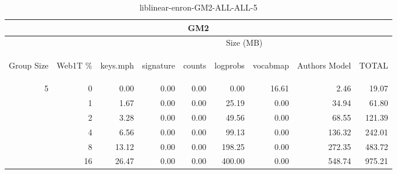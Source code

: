 \begin{center}
\begin{table}[htbp] 
 \begin{center}
\begin{tabular}{ | r | r | r | r | r | r | r | r | r |}
\hline
\multicolumn{9}{|c|}{GM2}\\
\hline
 & & \multicolumn{7}{|c|}{Size (MB)}\\ \cline{3-9}
\begin{sideways}Group Size\end{sideways} & \begin{sideways}Web1T \% \end{sideways} & \begin{sideways}keys.mph\end{sideways} & \begin{sideways}signature\end{sideways} & \begin{sideways}counts\end{sideways} & \begin{sideways}logprobs\end{sideways} & \begin{sideways}vocabmap\end{sideways} & \begin{sideways}Authors Model \end{sideways} & \begin{sideways}TOTAL\end{sideways}\\
\hline
\multirow{5}{*}{5}
 & 0 & 0.00 & 0.00 & 0.00 & 0.00 & 16.61 & 2.46 & 19.07\\ \cline{2-9}
 & 1 & 1.67 & 0.00 & 0.00 & 25.19 & 0.00 & 34.94 & 61.80\\ \cline{2-9}
 & 2 & 3.28 & 0.00 & 0.00 & 49.56 & 0.00 & 68.55 & 121.39\\ \cline{2-9}
 & 4 & 6.56 & 0.00 & 0.00 & 99.13 & 0.00 & 136.32 & 242.01\\ \cline{2-9}
 & 8 & 13.12 & 0.00 & 0.00 & 198.25 & 0.00 & 272.35 & 483.72\\ \cline{2-9}
 & 16 & 26.47 & 0.00 & 0.00 & 400.00 & 0.00 & 548.74 & 975.21\\ \cline{2-9}
\hline
\end{tabular}
\caption{liblinear-enron-GM2-ALL-ALL-5}
\label{table:liblinear-enron-GM2-ALL-ALL-5}
\end{center}
 \end{table}
\end{center}

